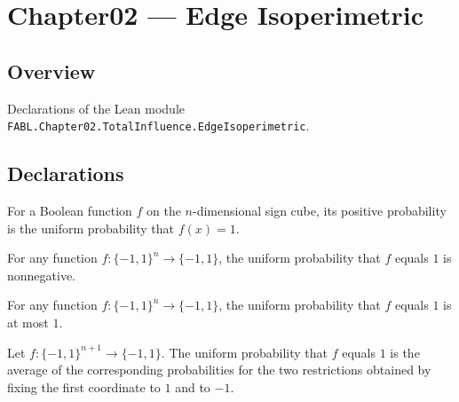 \chapter{Chapter02 — Edge Isoperimetric}
\section{Overview}

Declarations of the Lean module \texttt{FABL.Chapter02.TotalInfluence.EdgeIsoperimetric}.

\section{Declarations}

\begin{definition}
\label{FABL.positiveProbability}
\leanok
{}
For a Boolean function $f$ on the $n$-dimensional sign cube, its positive probability is
the uniform probability that $f(x)=1$.
\end{definition}

\begin{theorem}
\label{FABL.positiveProbability_nonneg}
\leanok
{}
For any function $f:\{-1,1\}^n\to\{-1,1\}$, the uniform probability that $f$ equals $1$
is nonnegative.
\end{theorem}

\begin{theorem}
\label{FABL.positiveProbability_le_one}
\leanok
{}
For any function $f:\{-1,1\}^n\to\{-1,1\}$, the uniform probability that $f$ equals $1$
is at most $1$.
\end{theorem}

\begin{theorem}
\label{FABL.positiveProbability_cons}
\leanok
{}
Let $f:\{-1,1\}^{n+1}\to\{-1,1\}$. The uniform probability that $f$ equals $1$ is the
average of the corresponding probabilities for the two restrictions obtained by fixing
the first coordinate to $1$ and to $-1$.
\end{theorem}

